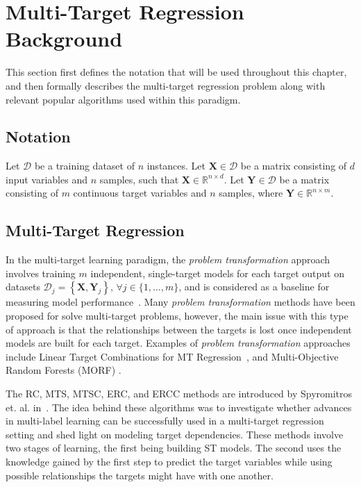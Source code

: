 \documentclass[reqno]{vcuthesis}
\newcommand{\set}[1]{{\left\{#1\right\}}}
\numberwithin{equation}{chapter}
\begin{document}
\section{Multi-Target Regression Background}\label{sec:MTRbackground}
This section first defines the notation that will be used throughout this chapter, and then formally describes the multi-target regression problem along with relevant popular algorithms used within this paradigm.

\subsection{Notation}\label{subsec:mtrnotation}
Let $\mathcal{D}$ be a training dataset of $n$ instances. Let $\bm{X} \in \mathcal{D}$ be a matrix consisting of $d$ input variables and $n$ samples, such that $\bm{X} \in \mathbb{R}^{n \times d}$. Let $\bm{Y} \in \mathcal{D}$ be a matrix consisting of $m$ continuous target variables and $n$ samples,  where $\bm{Y} \in \mathbb{R}^{n \times m}$. 

\subsection{Multi-Target Regression}
In the multi-target learning paradigm, the \textit{problem transformation} approach involves training $m$ independent, single-target models for each target output on datasets $\mathcal{D}_j = \set{\bm X, \bm Y_j},\, \forall j \in \{1, \ldots, m\}$, and is considered as a baseline for measuring model performance~\cite{Spyromitros2014}. Many \textit{problem transformation} methods have been proposed for solve multi-target problems, however, the main issue with this type of approach is that the relationships between the targets is lost once independent models are built for each target. Examples of \textit{problem transformation} approaches include Linear Target Combinations for MT Regression~\cite{Tsoumakas2014}, and Multi-Objective Random Forests (MORF) \cite{Kocev2007}. 

The RC, MTS, MTSC, ERC, and ERCC methods are introduced by Spyromitros et. al. in~\cite{Spyromitros2014}. The idea behind these algorithms was to investigate whether advances in multi-label learning can be successfully used in a multi-target regression setting and shed light on modeling target dependencies. These methods involve two stages of learning, the first being building ST models. The second uses the knowledge gained by the first step to predict the target variables while using possible relationships the targets might have with one another. 
\end{document}
